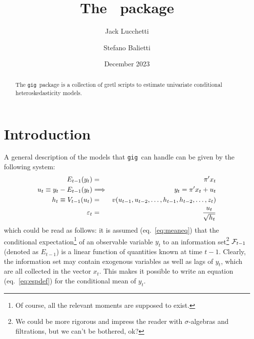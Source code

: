\documentclass[a4paper,11pt]{article}
\title{The \gig\ package}
\author{Jack Lucchetti \and Stefano Balietti}
\date{December 2023}
\newcommand{\app}[1]{\textsf{#1}}
\newcounter{script}[section]
\newcommand{\stdu}{\ensuremath \varepsilon}
\newcommand{\uhat}{\ensuremath u}
\newcommand{\InfSet}[1]{\ensuremath \mathcal{F}_{#1}}
\newcommand{\gig}{\texttt{gig}}
\begin{document}
\maketitle

\begin{abstract}
The \gig\ package is a collection of \app{gretl} scripts to estimate
univariate conditional heteroskedasticity models. %
\end{abstract}

\tableofcontents

\section{Introduction}

A general description of the models that \gig\ can handle can be given
by the following system:
\begin{eqnarray}
  \label{eq:meaneq}
  E_{t-1}(y_t) & = & \pi'x_t \\
  \label{eq:espdef}
  \uhat_{t} \equiv y_t - E_{t-1}(y_t) & \Longrightarrow &
  y_t = \pi'x_t + \uhat_{t} \\
  \label{eq:vareq}
  h_t \equiv V_{t-1}(\uhat_{t}) & = &
  v(\uhat_{t-1}, \uhat_{t-2}, \ldots,
  h_{t-1}, h_{t-2}, \ldots, z_t) \\
  \label{eq:stdinn}
  \stdu_t & = & \frac{\uhat_{t}}{\sqrt{h_t}}
\end{eqnarray}
which could be read as follows: it is assumed (eq.~\ref{eq:meaneq})
that the conditional expectation\footnote{Of course, all the relevant
  moments are supposed to exist.} of an observable variable $y_t$ to an
information set\footnote{We could be more rigorous and impress the
  reader with $\sigma$-algebras and filtrations, but we can't be
  bothered, ok?}  $\InfSet{t-1}$ (denoted as $E_{t-1}$) is a linear
function of quantities known at time $t-1$. Clearly, the information
set may contain exogenous variables as well as lags of $y_t$, which
are all collected in the vector $x_t$. This makes it possible to write
an equation (eq.~\ref{eq:espdef}) for the conditional mean of $y_t$.
\end{document}
